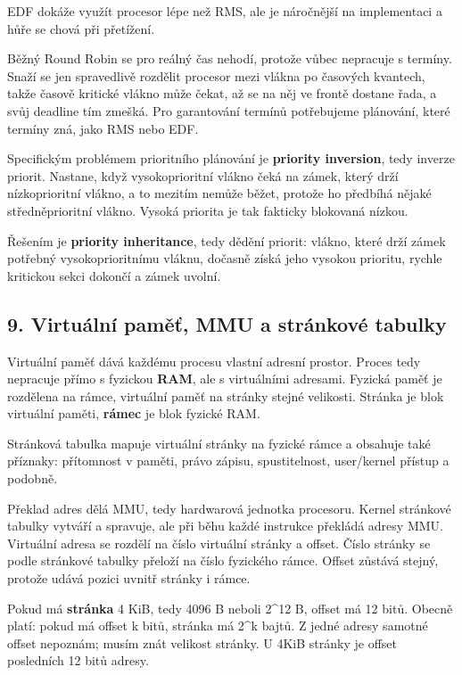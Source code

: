 EDF dokáže využít procesor lépe než RMS, ale je náročnější na implementaci a hůře se chová při přetížení.

Běžný Round Robin se pro reálný čas nehodí, protože vůbec nepracuje s termíny. Snaží se jen spravedlivě rozdělit procesor mezi vlákna po časových kvantech, takže časově kritické vlákno může čekat, až se na něj ve frontě dostane řada, a svůj deadline tím zmešká. Pro garantování termínů potřebujeme plánování, které termíny zná, jako RMS nebo EDF.

Specifickým problémem prioritního plánování je \textbf{priority inversion}, tedy inverze priorit. Nastane, když vysokoprioritní vlákno čeká na zámek, který drží nízkoprioritní vlákno, a to mezitím nemůže běžet, protože ho předbíhá nějaké středněprioritní vlákno. Vysoká priorita je tak fakticky blokovaná nízkou.

Řešením je \textbf{priority inheritance}, tedy dědění priorit: vlákno, které drží zámek potřebný vysokoprioritnímu vláknu, dočasně získá jeho vysokou prioritu, rychle kritickou sekci dokončí a zámek uvolní.

\subsection*{9. Virtuální paměť, MMU a stránkové tabulky}

Virtuální paměť dává každému procesu vlastní adresní prostor. Proces tedy nepracuje přímo s fyzickou \textbf{RAM}, ale s virtuálními adresami. Fyzická paměť je rozdělena na rámce, virtuální paměť na stránky stejné velikosti. Stránka je blok virtuální paměti, \textbf{rámec} je blok fyzické RAM.

Stránková tabulka mapuje virtuální stránky na fyzické rámce a obsahuje také příznaky: přítomnost v paměti, právo zápisu, spustitelnost, user/kernel přístup a podobně.

Překlad adres dělá MMU, tedy hardwarová jednotka procesoru. Kernel stránkové tabulky vytváří a spravuje, ale při běhu každé instrukce překládá adresy MMU. Virtuální adresa se rozdělí na číslo virtuální stránky a offset. Číslo stránky se podle stránkové tabulky přeloží na číslo fyzického rámce. Offset zůstává stejný, protože udává pozici uvnitř stránky i rámce.

Pokud má \textbf{stránka} 4 KiB, tedy 4096 B neboli 2\textasciicircum{}12 B, offset má 12 bitů. Obecně platí: pokud má offset k bitů, stránka má 2\textasciicircum{}k bajtů. Z jedné adresy samotné offset nepoznám; musím znát velikost stránky. U 4KiB stránky je offset posledních 12 bitů adresy.


